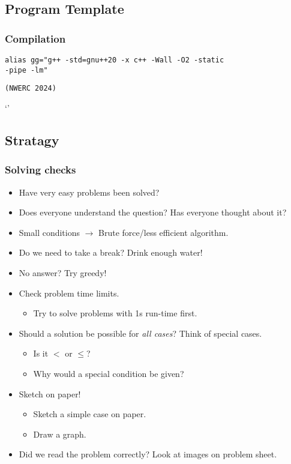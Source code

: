 

\subsection{Program Template}


\subsubsection{Compilation}
\begin{verbatim}
alias gg="g++ -std=gnu++20 -x c++ -Wall -O2 -static
-pipe -lm"
\end{verbatim}
{\color{gray}\texttt{(NWERC 2024)}}

\newpage
`'
\subsection{Stratagy}

\subsubsection{Solving checks}
\begin{itemize}
    \item Have very easy problems been solved?
    \item Does everyone understand the question? Has everyone thought about it?
    \item Small conditions $\rightarrow$ Brute force/less efficient algorithm.
    \item Do we need to take a break? Drink enough water!
    \item No answer? Try greedy!
    \item Check problem time limits.
    \begin{itemize}
        \item Try to solve problems with 1s run-time first.
    \end{itemize}
    \item Should a solution be possible for \textit{all cases}? Think of special cases.
    \begin{itemize}
        \item Is it $<$ or $\leq$?
        \item Why would a special condition be given?
    \end{itemize}
    \item Sketch on paper!
    \begin{itemize}
        \item Sketch a simple case on paper.
        \item Draw a graph.
    \end{itemize}
    \item Did we read the problem correctly? Look at images on problem sheet.
\end{itemize}

